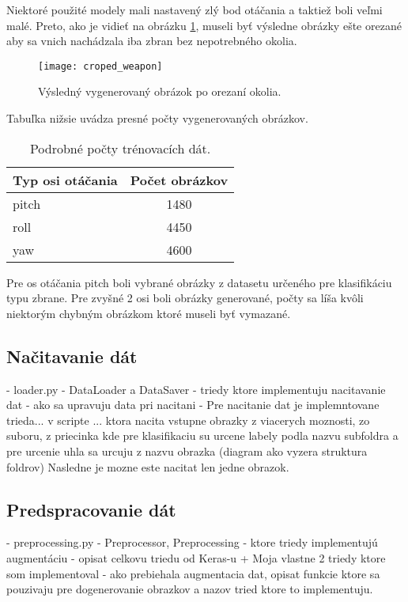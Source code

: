 Niektoré použité modely mali nastavený zlý bod otáčania a taktiež boli veľmi malé.
Preto, ako je vidieť na obrázku \ref{pic:generator3d}, museli byť výsledne obrázky ešte orezané aby sa vnich nachádzala iba zbran bez nepotrebného okolia.

\begin{figure}[H]
    \centering
    \texttt{[image: croped\_weapon]}
    \caption{Výsledný vygenerovaný obrázok po orezaní okolia.}
    \label{pic:generator3d}
\end{figure}

Tabuľka nižsie uvádza presné počty vygenerovaných obrázkov.

\begin{table}[H]
    \centering
    \label{my-label}
    \begin{tabular}{|l|c|}
        \hline
        Typ osi otáčania & \multicolumn{1}{l|}{Počet obrázkov} \\ \hline
        pitch            & 1480                                \\ \hline
        roll             & 4450                                \\ \hline
        yaw              & 4600                                \\ \hline
        \end{tabular}
    \caption{Podrobné počty trénovacích dát.}
\end{table}

Pre os otáčania pitch boli vybrané obrázky z datasetu určeného pre klasifikáciu typu zbrane.
Pre zvyšné 2 osi boli obrázky generované, počty sa líša kvôli niektorým chybným obrázkom ktoré museli byť vymazané.

\subsection{Načitavanie dát}
\label{subsec:nacitaniedat}
- loader.py - DataLoader a DataSaver
- triedy ktore implementuju nacitavanie dat
- ako sa upravuju data pri nacitani
- Pre nacitanie dat je implemntovane trieda... v scripte ... ktora nacita vstupne obrazky z viacerych moznosti, zo suboru,
  z priecinka kde pre klasifikaciu su urcene labely podla nazvu subfoldra a pre urcenie uhla sa urcuju z nazvu obrazka (diagram ako vyzera struktura foldrov)
  Nasledne je mozne este nacitat len jedne obrazok.

\subsection{Predspracovanie dát}
\label{subsec:predspracovaniedat}
- preprocessing.py - Preprocessor, Preprocessing
- ktore triedy implementujú augmentáciu
- opisat celkovu triedu od Keras-u + Moja vlastne 2 triedy ktore som implementoval
- ako prebiehala augmentacia dat, opisat funkcie ktore sa pouzivaju pre dogenerovanie obrazkov a nazov tried ktore to implementuju.
